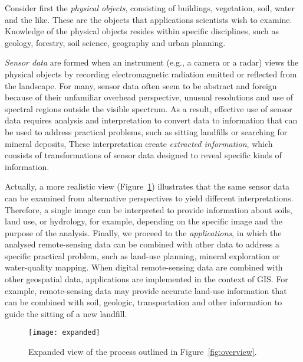 Consider first the \emph{physical objects}, consisting of buildings,
vegetation, soil, water and the like. These are the objects that
applications scientists wish to examine. Knowledge of the physical
objects resides within specific disciplines, such as geology, forestry,
soil science, geography and urban planning.


\emph{Sensor data} are formed when an instrument (e.g., a camera or a radar)
views the physical objects by recording electromagnetic radiation emitted or
reflected from the landscape. For many, sensor data often seem to be abstract
and foreign because of their unfamiliar overhead perspective, unusual
resolutions and use of spectral regions outside the visible spectrum. As a
result, effective use of sensor data requires analysis and interpretation to
convert data to information that can be used to address practical problems,
such as sitting landfills or searching for mineral deposits, These
interpretation create \emph{extracted information}, which consists of
transformations of sensor data designed to reveal specific kinds of
information.


Actually, a more realistic view (Figure~\ref{fig:expanded}) illustrates that
the same sensor data can be examined from alternative perspectives to yield
different interpretations. Therefore, a single image can be interpreted to
provide information about soils, land use, or hydrology, for example,
depending on the specific image and the purpose of the analysis. Finally,
we proceed to the \emph{applications}, in which the analysed \gls{remote-sensing}
data can be combined with other data to address a specific practical problem,
such as land-use planning, mineral exploration or water-quality mapping. When
digital \gls{remote-sensing} data are combined with other geospatial data,
applications are implemented in the context of GIS. For example, \gls{remote-sensing}
data may provide accurate land-use information that can be combined with soil,
geologic, transportation and other information to guide the sitting of a new
landfill.
\begin{figure}[h]
    \centering
    \texttt{[image: expanded]}
    \caption{Expanded view of the process outlined in Figure~\ref{fig:overview}.}
    \label{fig:expanded}
\end{figure}


